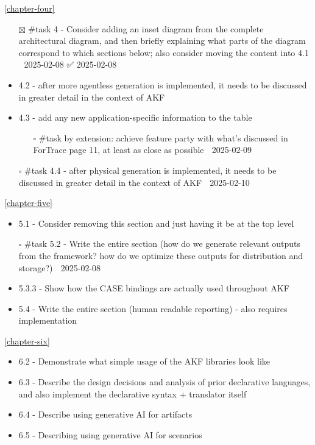 \autoref{chapter-four}

\begin{itemize}
\tightlist
\item[$\boxtimes$]
  \#task 4 - Consider adding an inset diagram from the complete
  architectural diagram, and then briefly explaining what parts of the
  diagram correspond to which sections below; also consider moving the
  content into 4.1 📅 2025-02-08 ✅ 2025-02-08
\item
  4.2 - after more agentless generation is implemented, it needs to be
  discussed in greater detail in the context of AKF
\item
  4.3 - add any new application-specific information to the table

  \begin{itemize}
  \tightlist
  \item[$\square$]
    \#task by extension: achieve feature party with what's discussed in
    ForTrace page 11, at least as close as possible 📅 2025-02-09
  \end{itemize}
\item[$\square$]
  \#task 4.4 - after physical generation is implemented, it needs to be
  discussed in greater detail in the context of AKF 📅 2025-02-10
\end{itemize}

\autoref{chapter-five}

\begin{itemize}
\tightlist
\item
  5.1 - Consider removing this section and just having it be at the top
  level
\item[$\square$]
  \#task 5.2 - Write the entire section (how do we generate relevant
  outputs from the framework? how do we optimize these outputs for
  distribution and storage?) 📅 2025-02-08
\item
  5.3.3 - Show how the CASE bindings are actually used throughout AKF
\item
  5.4 - Write the entire section (human readable reporting) - also
  requires implementation
\end{itemize}

\autoref{chapter-six}

\begin{itemize}
\tightlist
\item
  6.2 - Demonstrate what simple usage of the AKF libraries look like
\item
  6.3 - Describe the design decisions and analysis of prior declarative
  languages, and also implement the declarative syntax + translator
  itself
\item
  6.4 - Describe using generative AI for artifacts
\item
  6.5 - Describing using generative AI for scenarios
\end{itemize}

